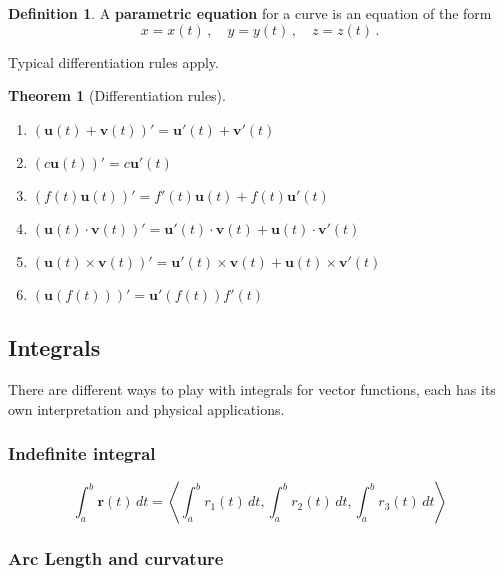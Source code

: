 \documentclass[
]{book}
\newtheorem{theorem}{Theorem}[chapter]
\theoremstyle{definition}
\newtheorem{definition}{Definition}[chapter]
\theoremstyle{definition}
\theoremstyle{definition}
\theoremstyle{definition}
\theoremstyle{remark}
\begin{document}
\begin{definition}
A \textbf{parametric equation} for a curve is an equation of the form
\[
x=x(t)\,, \quad  y = y(t)\,, \quad z = z(t) \,.
\]
\end{definition}

Typical differentiation rules apply.

\begin{theorem}[Differentiation rules]
\leavevmode

\begin{enumerate}
\def\labelenumi{\arabic{enumi}.}
\item
  \((\mathbf{u}(t) + \mathbf{v}(t))' = \mathbf{u}'(t) + \mathbf{v}'(t)\)
\item
  \((c \mathbf{u}(t))' = c \mathbf{u}'(t)\)
\item
  \((f(t) \mathbf{u}(t))' = f'(t) \mathbf{u}(t) + f(t) \mathbf{u}'(t)\)
\item
  \((\mathbf{u}(t) \cdot \mathbf{v}(t))' = \mathbf{u}'(t)\cdot \mathbf{v}(t) + \mathbf{u}(t)\cdot \mathbf{v}'(t)\)
\item
  \((\mathbf{u}(t) \times \mathbf{v}(t))' = \mathbf{u}'(t)\times \mathbf{v}(t) + \mathbf{u}(t)\times \mathbf{v}'(t)\)
\item
  \((\mathbf{u}(f(t)))' = \mathbf{u}'(f(t)) f'(t)\)
\end{enumerate}

\end{theorem}

\hypertarget{integrals}{%
\subsection{Integrals}\label{integrals}}

There are different ways to play with integrals for vector functions,
each has its own interpretation and physical applications.

\hypertarget{indefinite-integral}{%
\subsubsection{Indefinite integral}\label{indefinite-integral}}

\begin{equation*}
    \int_a^b \mathbf{r}(t) \, dt = \left\langle \int_a^b r_1(t) \, dt, \int_a^b r_2(t) \, dt, \int_a^b r_3(t) \, dt \right\rangle
\end{equation*}

\hypertarget{arc-length-and-curvature}{%
\subsubsection{Arc Length and curvature}\label{arc-length-and-curvature}}
\end{document}
